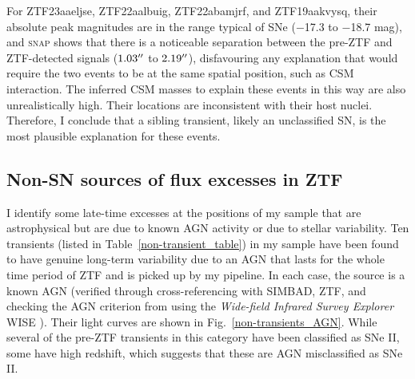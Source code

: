 \documentclass[a4paper,oneside,12pt, class=Latex/Classes/PhDthesisPSnPDF, crop=false]{standalone}
\begin{document}
For ZTF23aaeljse, ZTF22aalbuig, ZTF22abamjrf, and ZTF19aakvysq, their absolute peak magnitudes are in the range typical of SNe ($-$17.3 to $-$18.7 mag), and \textsc{snap} shows that there is a noticeable separation between the pre-ZTF and ZTF-detected signals ($1.03^{\prime\prime}$ to $2.19^{\prime\prime}$), disfavouring any explanation that would require the two events to be at the same spatial position, such as CSM interaction. The inferred CSM masses to explain these events in this way are also unrealistically high. Their locations are inconsistent with their host nuclei. Therefore, I conclude that a sibling transient, likely an unclassified SN, is the most plausible explanation for these events.


\subsection{Non-SN sources of flux excesses in ZTF}
\label{non-sn}
I identify some late-time excesses at the positions of my sample that are astrophysical but are due to known AGN activity or due to stellar variability. Ten transients (listed in Table~\ref{non-transient_table}) in my sample have been found to have genuine long-term variability due to an AGN that lasts for the whole time period of ZTF and is picked up by my pipeline. In each case, the source is a known AGN (verified through cross-referencing with SIMBAD, ZTF, and checking the AGN criterion from \citealt{WISE_crit} using the \textit{Wide-field Infrared Survey Explorer} WISE \citealt{WISE}). Their light curves are shown in Fig.~\ref{non-transients_AGN}. While several of the pre-ZTF transients in this category have been classified as SNe II, some have high redshift, which suggests that these are AGN misclassified as SNe II.
\end{document}
